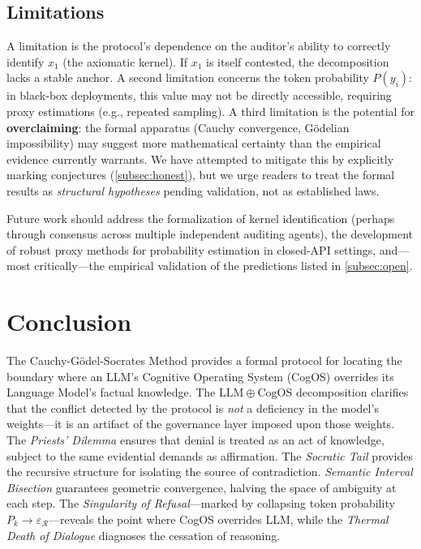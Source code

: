 \documentclass[11pt,a4paper]{article}
\theoremstyle{definition}
\theoremstyle{plain}
\theoremstyle{remark}
\begin{document}
\subsection{Limitations}\label{subsec:limits}

A limitation is the protocol's dependence on the auditor's ability to correctly identify $x_1$ (the axiomatic kernel). If $x_1$ is itself contested, the decomposition lacks a stable anchor. A second limitation concerns the token probability $P(y_i)$: in black-box deployments, this value may not be directly accessible, requiring proxy estimations (e.g., repeated sampling). A third limitation is the potential for \textbf{overclaiming}: the formal apparatus (Cauchy convergence, Gödelian impossibility) may suggest more mathematical certainty than the empirical evidence currently warrants. We have attempted to mitigate this by explicitly marking conjectures (\cref{subsec:honest}), but we urge readers to treat the formal results as \emph{structural hypotheses} pending validation, not as established laws.

Future work should address the formalization of kernel identification (perhaps through consensus across multiple independent auditing agents), the development of robust proxy methods for probability estimation in closed-API settings, and---most critically---the empirical validation of the predictions listed in \cref{subsec:open}.


\section{Conclusion}\label{sec:conclusion}

The Cauchy-G\"{o}del-Socrates Method provides a formal protocol for locating the boundary where an LLM's Cognitive Operating System (CogOS) overrides its Language Model's factual knowledge. The $\mathrm{LLM} \oplus \mathrm{CogOS}$ decomposition clarifies that the conflict detected by the protocol is \emph{not} a deficiency in the model's weights---it is an artifact of the governance layer imposed upon those weights. The \textit{Priests' Dilemma} ensures that denial is treated as an act of knowledge, subject to the same evidential demands as affirmation. The \textit{Socratic Tail} provides the recursive structure for isolating the source of contradiction. \textit{Semantic Interval Bisection} guarantees geometric convergence, halving the space of ambiguity at each step. The \textit{Singularity of Refusal}---marked by collapsing token probability $P_k \to \varepsilon_{\mathcal{R}}$---reveals the point where CogOS overrides LLM, while the \textit{Thermal Death of Dialogue} diagnoses the cessation of reasoning.
\end{document}
